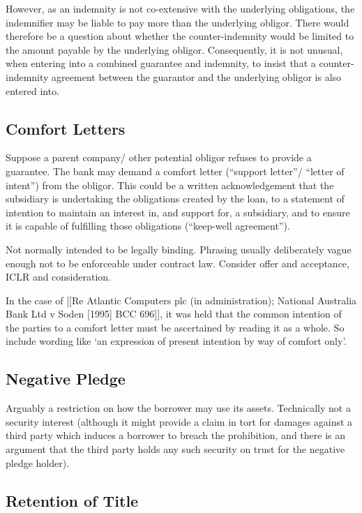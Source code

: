 \documentclass[
]{article}
\begin{document}
However, as an indemnity is not co-extensive with the underlying
obligations, the indemnifier may be liable to pay more than the
underlying obligor. There would therefore be a question about whether
the counter-indemnity would be limited to the amount payable by the
underlying obligor. Consequently, it is not unusual, when entering into
a combined guarantee and indemnity, to insist that a counter-indemnity
agreement between the guarantor and the underlying obligor is also
entered into.

\hypertarget{comfort-letters}{%
\subsection{Comfort Letters}\label{comfort-letters}}

Suppose a parent company/ other potential obligor refuses to provide a
guarantee. The bank may demand a comfort letter (``support letter''/
``letter of intent'') from the obligor. This could be a written
acknowledgement that the subsidiary is undertaking the obligations
created by the loan, to a statement of intention to maintain an interest
in, and support for, a subsidiary, and to ensure it is capable of
fulfilling those obligations (``keep-well agreement'').

Not normally intended to be legally binding. Phrasing usually
deliberately vague enough not to be enforceable under contract law.
Consider offer and acceptance, ICLR and consideration.

In the case of {[}{[}Re Atlantic Computers plc (in administration);
National Australia Bank Ltd v Soden {[}1995{]} BCC 696{]}{]}, it was
held that the common intention of the parties to a comfort letter must
be ascertained by reading it as a whole. So include wording like `an
expression of present intention by way of comfort only'.

\hypertarget{negative-pledge}{%
\subsection{Negative Pledge}\label{negative-pledge}}

Arguably a restriction on how the borrower may use its assets.
Technically not a security interest (although it might provide a claim
in tort for damages against a third party which induces a borrower to
breach the prohibition, and there is an argument that the third party
holds any such security on trust for the negative pledge holder).

\hypertarget{retention-of-title}{%
\subsection{Retention of Title}\label{retention-of-title}}
\end{document}
